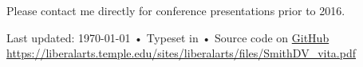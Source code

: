 \documentclass[11pt, letterpaper]{article}
\begin{document}
\vspace{.5cm}
Please contact me directly for conference presentations prior to 2016. 




\vfill{}

\begin{center}
{\scriptsize  Last updated: \today\- •\-
Typeset in \href{http://nitens.org/taraborelli/cvtex}{\XeTeX} •\- Source code on \href{https://github.com/DVSneuro/my-cv}{GitHub}\\
\href{https://github.com/DVSneuro/my-cv/blob/master/smith\_cv.pdf}{https://liberalarts.temple.edu/sites/liberalarts/files/SmithDV\_vita.pdf}}
\end{center}
\end{document}
